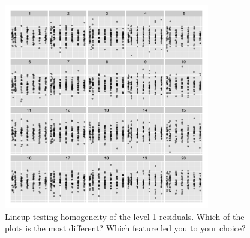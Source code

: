 \documentclass[12pt]{article} %
\begin{document}


\begin{figure}[hbt]
	\centering
	\includegraphics[width=0.8\textwidth]{dialyzerheterogeneous-19.pdf}
	\caption{\label{fig:constvar2} 
	Lineup testing homogeneity of the level-1 residuals. Which of the plots is the most different? Which feature led you to your choice?}
\end{figure}
\end{document}
